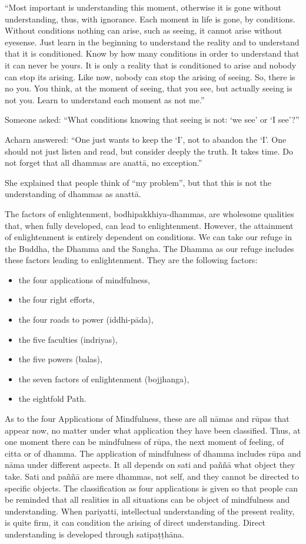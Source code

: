 ``Most important is understanding this moment, otherwise it is gone
without understanding, thus, with ignorance. Each moment in life is
gone, by conditions. Without conditions nothing can arise, such as
seeing, it cannot arise without eyesense. Just learn in the beginning to
understand the reality and to understand that it is conditioned. Know by
how many conditions in order to understand that it can never be yours.
It is only a reality that is conditioned to arise and nobody can stop
its arising. Like now, nobody can stop the arising of seeing. So, there
is no you. You think, at the moment of seeing, that you see, but
actually seeing is not you. Learn to understand each moment as not me.''

Someone asked: ``What conditions knowing that seeing is not: `we see' or
`I see'?''

Acharn answered: ``One just wants to keep the `I', not to abandon the
`I'. One should not just listen and read, but consider deeply the truth.
It takes time. Do not forget that all dhammas are anattā, no
exception.''

She explained that people think of ``my problem'', but that this is not
the understanding of dhammas as anattā.

The factors of enlightenment, bodhipakkhiya-dhammas, are wholesome
qualities that, when fully developed, can lead to enlightenment.
However, the attainment of enlightenment is entirely dependent on
conditions. We can take our refuge in the Buddha, the Dhamma and the
Sangha. The Dhamma as our refuge includes these factors leading to
enlightenment. They are the following factors:

\begin{itemize}
\item
  the four applications of mindfulness,
\item
  the four right efforts,
\item
  the four roads to power (iddhi-pāda),
\item
  the five faculties (indriyas),
\item
  the five powers (balas),
\item
  the seven factors of enlightenment (bojjhanga),
\item
  the eightfold Path.
\end{itemize}

As to the four Applications of Mindfulness, these are all nāmas and
rūpas that appear now, no matter under what application they have been
classified. Thus, at one moment there can be mindfulness of rūpa, the
next moment of feeling, of citta or of dhamma. The application of
mindfulness of dhamma includes rūpa and nāma under different aspects. It
all depends on sati and paññā what object they take. Sati and paññā are
mere dhammas, not self, and they cannot be directed to specific objects.
The classification as four applications is given so that people can be
reminded that all realities in all situations can be object of
mindfulness and understanding. When pariyatti, intellectual
understanding of the present reality, is quite firm, it can condition
the arising of direct understanding. Direct understanding is developed
through satipaṭṭhāna.


